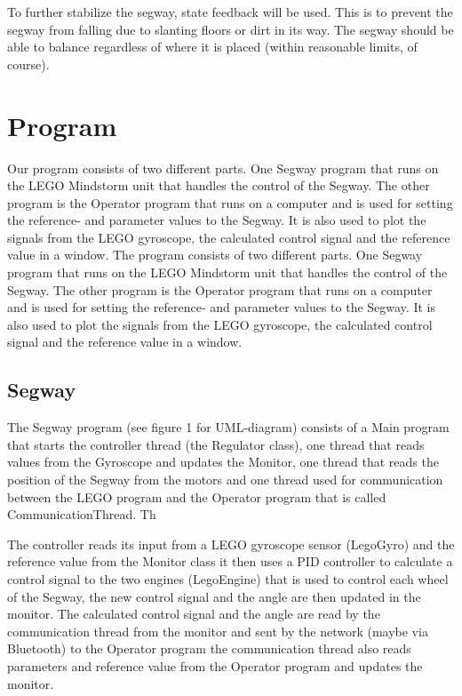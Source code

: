 To further stabilize the segway, state feedback will be used. This is to prevent the segway from falling due to slanting floors or dirt in its way. The segway should be able to balance regardless of where it is placed (within reasonable limits, of course).


\section{Program}
Our program consists of two different parts. One Segway program that runs on the LEGO Mindstorm unit that handles the control of the Segway. The other program is the Operator program that runs on a computer and is used for setting the reference- and parameter values to the Segway. It is also used to plot the signals from the LEGO gyroscope, the calculated control signal and the reference value in a window. 
The program consists of two different parts. One Segway program that runs on the LEGO Mindstorm unit that handles the control of the Segway. The other program is the Operator program that runs on a computer and is used for setting the reference- and parameter values to the Segway. It is also used to plot the signals from the LEGO gyroscope, the calculated control signal and the reference value in a window. %

\subsection{Segway}
The Segway program (see figure 1 for UML-diagram) consists of a Main program that starts the controller thread (the Regulator class), one thread that reads values from the Gyroscope and updates the Monitor, one thread that reads the position of the Segway from the motors and one thread used for communication between the LEGO program and the Operator program that is called CommunicationThread. Th






The controller reads its input from a LEGO gyroscope sensor (LegoGyro) and the reference value from the Monitor class it then uses a PID controller to calculate a control signal to the two engines (LegoEngine) that is used to control each wheel of the Segway, the new control signal and the angle are then updated in the monitor. The calculated control signal and the angle are read by the communication thread from the monitor and sent by the network (maybe via Bluetooth) to the Operator program the communication thread also reads parameters and reference value from the Operator program and updates the monitor.

